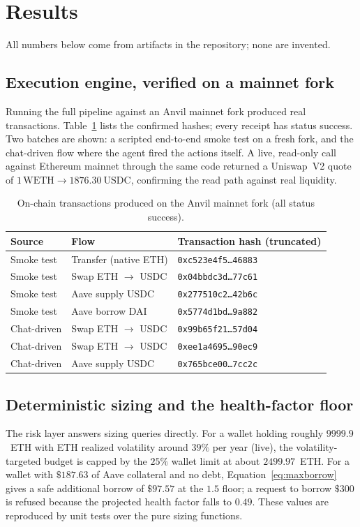 \documentclass[11pt]{article}
\newcommand{\code}[1]{\texttt{#1}}
\begin{document}
\section{Results}\label{sec:results}
All numbers below come from artifacts in the repository; none are invented.

\subsection{Execution engine, verified on a mainnet fork}
Running the full pipeline against an Anvil mainnet fork produced real transactions. Table~\ref{tab:tx}
lists the confirmed hashes; every receipt has status success. Two batches are shown: a scripted
end-to-end smoke test on a fresh fork, and the chat-driven flow where the agent fired the actions
itself. A live, read-only call against Ethereum mainnet through the same code returned a Uniswap~V2
quote of $1\,\text{WETH} \rightarrow 1876.30\ \text{USDC}$, confirming the read path against real
liquidity.

\begin{table}[h]
\centering
\small
\begin{tabular}{l l l}
\hline
Source & Flow & Transaction hash (truncated) \\
\hline
Smoke test & Transfer (native ETH)        & \code{0xc523e4f5\ldots46883} \\
Smoke test & Swap ETH $\rightarrow$ USDC  & \code{0x04bbdc3d\ldots77c61} \\
Smoke test & Aave supply USDC             & \code{0x277510c2\ldots42b6c} \\
Smoke test & Aave borrow DAI              & \code{0x5774d1bd\ldots9a882} \\
Chat-driven & Swap ETH $\rightarrow$ USDC & \code{0x99b65f21\ldots57d04} \\
Chat-driven & Swap ETH $\rightarrow$ USDC & \code{0xee1a4695\ldots90ec9} \\
Chat-driven & Aave supply USDC            & \code{0x765bce00\ldots7cc2c} \\
\hline
\end{tabular}
\caption{On-chain transactions produced on the Anvil mainnet fork (all status success).}
\label{tab:tx}
\end{table}

\subsection{Deterministic sizing and the health-factor floor}
The risk layer answers sizing queries directly. For a wallet holding roughly $9999.9$~ETH with ETH
realized volatility around $39\%$ per year (live), the volatility-targeted budget is capped by the
$25\%$ wallet limit at about $2499.97$~ETH. For a wallet with $\$187.63$ of Aave collateral and no
debt, Equation~\eqref{eq:maxborrow} gives a safe additional borrow of $\$97.57$ at the $1.5$ floor; a
request to borrow $\$300$ is refused because the projected health factor falls to $0.49$. These values
are reproduced by unit tests over the pure sizing functions.
\end{document}

